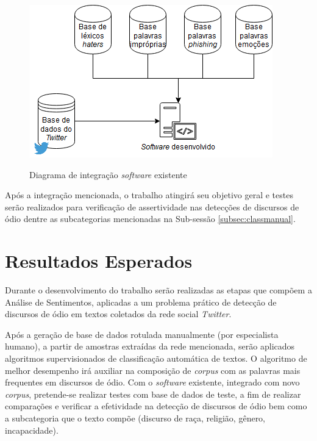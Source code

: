 \begin{figure}[!h]
\centering 
\caption{Diagrama de integração \textit{software} existente}
\includegraphics[scale=0.6]{imagens/implementacao.png}
\label{fig:implementacao}
\end{figure}
Após a integração mencionada, o trabalho atingirá seu objetivo geral e testes serão realizados para verificação de assertividade nas detecções de discursos de ódio dentre as subcategorias mencionadas na Sub-sessão \ref{subsec:classmanual}.

\section{Resultados Esperados}
Durante o desenvolvimento do trabalho serão realizadas as etapas que compõem a Análise de Sentimentos, aplicadas a um problema prático de detecção de discursos de ódio em textos coletados da rede social \textit{Twitter}.

Após a geração de base de dados rotulada manualmente (por especialista humano), a partir de amostras extraídas da rede mencionada, serão aplicados algoritmos supervisionados de classificação automática de textos. O algoritmo de melhor desempenho irá auxiliar na composição de \textit{corpus} com as palavras mais frequentes em discursos de ódio. Com o \textit{software} existente, integrado com novo \textit{corpus}, pretende-se realizar testes com base de dados de teste, a fim de realizar comparações e verificar a efetividade na detecção de discursos de ódio bem como a subcategoria que o texto compõe (discurso de raça, religião, gênero, incapacidade).